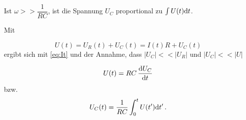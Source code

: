 Ist $\omega >> \dfrac{1}{RC}$, ist die Spannung $U_C$ proportional zu $\int U(t) \mathrm{d} t$.

Mit 

\begin{equation*}
    U(t) = U_R(t) + U_C(t) = I(t) R + U_C(t)
\end{equation*} ergibt sich mit \eqref{eq:It} und der Annahme, dass $|U_C| << |U_R|$ und $|U_C| << |U|$ 

\begin{equation}
    U(t) = RC \,\frac{\mathrm{d} U_C}{\mathrm{d} t}
\end{equation}
bzw.
\begin{equation}
    U_C(t) = \frac{1}{RC} \int_0^t U(t') \mathrm{d} t' \,.
    \label{eq:intkondspann}
\end{equation}
